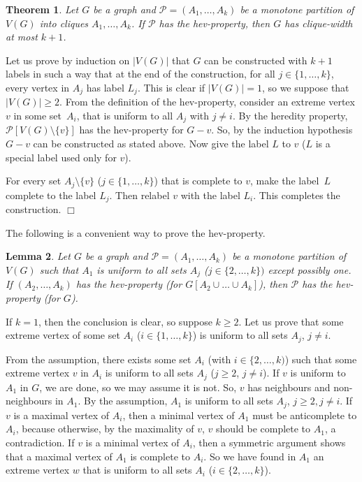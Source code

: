 \documentclass[12pt]{article}
\newtheorem{Theorem}{Theorem}[section]
\newtheorem{Lemma}[Theorem]{Lemma}
\newcommand{\qed}{\hfill $\Box$}
\begin{document}
	
	
	\begin{Theorem} 
		\label{th:bcw}
		Let $G$ be a graph and $\mathcal P = (A_1, \dots, A_k)$ be a monotone partition of $V(G)$ into cliques $A_1, \ldots, A_k$.  If $\mathcal P$ has the hev-property, then $G$ has clique-width at most $k+1$. 
	\end{Theorem}
	
	Let us prove by induction on $|V(G)|$ that $G$ can be constructed with $k+1$ labels in such a way that at the end of the construction, for all $j\in \{1, \dots, k\}$,  every vertex in $A_j$ has label $L_{j}$.  
	This is clear if $|V(G)| = 1$, so we suppose that $|V(G)| \geq 2$.  
	From the definition of the hev-property, consider an extreme vertex $v$ in some set~$A_i$, that is uniform to all $A_j$ with $j\neq i$. 
	By the heredity property, $\mathcal P[V(G) \setminus \{v\}]$ has the hev-property for $G-v$. So, by the induction hypothesis $G-v$ can be constructed as stated above. 
	Now give the label $L$ to $v$ ($L$ is a special label used only for $v$).  
	
	For every set $A_{j}\setminus \{v\}$ ($j\in \{1, \dots, k\}$) that is complete to $v$,  
	make the label~$L$ complete to the label $L_{j}$.  Then relabel $v$ with the label $L_{i}$. This completes the construction.
	\qed
	
	The following is a convenient way to prove the hev-property. 
	\begin{Lemma}
		\label{l:deg1B}
		Let $G$ be a graph and $\mathcal P = (A_1, \dots, A_k)$ be a monotone partition of $V(G)$ such that $A_1$ is uniform to all sets $A_j$ ($j\in \{2,\dots, k\})$ except possibly one. If $(A_2, \dots, A_k)$ has the hev-property (for $G[A_2 \cup \dots \cup A_k]$), then $\mathcal P$ has the hev-property (for $G$). 
	\end{Lemma}
	
	If $k=1$, then the conclusion is clear, so suppose $k\geq 2$. 
	Let us prove that some extreme vertex of some set $A_i$ ($i\in \{1, \dots, k\}$) is uniform to all sets $A_j$, $j\neq i$. 
	
	From the assumption, there exists some set $A_i$ (with $i\in \{2, \dots, k)$) such that some extreme vertex $v$ in $A_i$ is uniform to all sets $A_j$ ($j\geq 2$, $j\neq i$).  
	If $v$ is uniform to $A_1$ in $G$, we are done, so we may assume it is not.  
	So, $v$ has neighbours and non-neighbours in $A_1$. By the assumption, $A_1$ is uniform to all sets $A_j$, $j\geq 2, j\neq i$. 
	If $v$ is a maximal vertex of $A_i$, then a minimal vertex of $A_1$ must be
	anticomplete to $A_i$, because otherwise, by the maximality of $v$, $v$ should be complete to $A_1$, a contradiction.  
	If $v$ is a minimal vertex of $A_i$, then a symmetric argument shows that a maximal vertex of $A_1$ is complete to $A_i$.  
	So we have found in $A_1$ an extreme vertex $w$ that is uniform to all sets $A_i$ ($i\in \{2, \dots, k\}$).  
	
\end{document}

